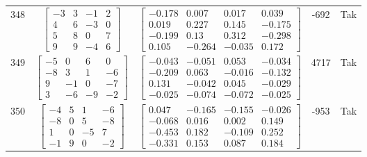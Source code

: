 \documentclass[a4paper,12pt]{article}
\begin{document}
\begin{tabular}{c c c c c}
348
&
$\begin{bmatrix} -3 & 3 & -1 & 2 \\ 4 & 6 & -3 & 0 \\ 5 & 8 & 0 & 7 \\ 9 & 9 & -4 & 6 \end{bmatrix}$
&
$\begin{bmatrix} -0.178 & 0.007 & 0.017 & 0.039 \\ 0.019 & 0.227 & 0.145 & -0.175 \\ -0.199 & 0.13 & 0.312 & -0.298 \\ 0.105 & -0.264 & -0.035 & 0.172 \end{bmatrix}$
&
-692
&
Tak
\\
349
&
$\begin{bmatrix} -5 & 0 & 6 & 0 \\ -8 & 3 & 1 & -6 \\ 9 & -1 & 0 & -7 \\ 3 & -6 & -9 & -2 \end{bmatrix}$
&
$\begin{bmatrix} -0.043 & -0.051 & 0.053 & -0.034 \\ -0.209 & 0.063 & -0.016 & -0.132 \\ 0.131 & -0.042 & 0.045 & -0.029 \\ -0.025 & -0.074 & -0.072 & -0.025 \end{bmatrix}$
&
4717
&
Tak
\\
350
&
$\begin{bmatrix} -4 & 5 & 1 & -6 \\ -8 & 0 & 5 & -8 \\ 1 & 0 & -5 & 7 \\ -1 & 9 & 0 & -2 \end{bmatrix}$
&
$\begin{bmatrix} 0.047 & -0.165 & -0.155 & -0.026 \\ -0.068 & 0.016 & 0.002 & 0.149 \\ -0.453 & 0.182 & -0.109 & 0.252 \\ -0.331 & 0.153 & 0.087 & 0.184 \end{bmatrix}$
&
-953
&
Tak
\\
\end{tabular} \egroup \newpage
\end{document}
